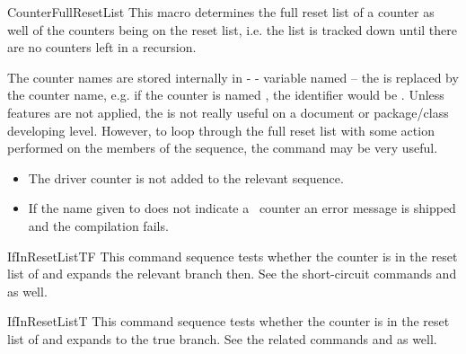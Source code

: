 \documentclass[12pt,a4paper,oneside]{article}
\makeatletter
\newcommand{\chdocextractversion}[1]{%
  \@nameuse{#1}%
}
\newcommand{\CHDocNew}[1]{%
  \tcbdocmarginnote[doclang/new={N},
  colframe=blue,
  halign=left,
  colback={blue!20!white},
  fontupper={\tiny}
  ]{%
    \chdocextractversion{xassoccntversion#1}%
  }%
}
\makeatother
\begin{document}
\begin{docCommand}[before={\CHDocNew{1.0}}\par]{CounterFullResetList}{}
  This macro determines the full reset list of a counter as well of the counters being on the reset list, i.e. the list is tracked down until there are no counters left in a recursion. 
  
  The counter names are stored internally in  -  - variable named  -- the  is replaced by the counter name, e.g. if the counter is named , the identifier would be . Unless  features are not applied, the  is not really useful on a document or package/class developing level. However, to loop through the full reset list with some action performed on the members of the sequence, the command  may be very useful. 

\begin{marker}
\begin{itemize}
\item The driver counter  is not added to the relevant sequence. 
\item If the name given to  does not indicate a \LaTeXe\ counter an error message is shipped and the compilation fails. 
\end{itemize}
\end{marker}
\end{docCommand}

\begin{docCommand}{IfInResetListTF}{\oarg{}}
This command sequence tests whether the counter  is in the reset list of  and expands the relevant branch then.
See the short-circuit commands  and  as well. 
\end{docCommand}

\begin{docCommand}{IfInResetListT}{\oarg{}}
This command sequence tests whether the counter  is in the reset list of  and expands to the true branch.
See the related commands  and  as well. 
\end{docCommand}
\end{document}
